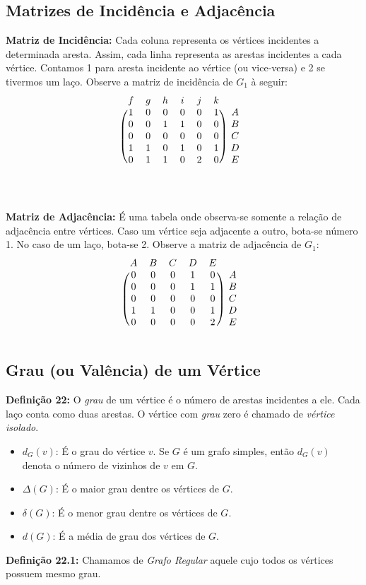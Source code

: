 \documentclass[a4paper,12pt]{article}
\begin{document}
	\subsection{Matrizes de Incidência e Adjacência}
	\noindent\textbf{Matriz de Incidência: }Cada coluna representa os vértices incidentes a determinada aresta. Assim, cada linha representa as arestas incidentes a cada vértice. Contamos 1 para aresta incidente ao vértice (ou vice-versa) e 2 se tivermos um laço. Observe a matriz de incidência de $G_1$ à seguir:
	\[
	\begin{blockarray}{ccccccc}
	f & g & h & i & j & k \\
	\begin{block}{(cccccc)c}
	1 & 0 & 0 & 0 & 0 & 1 & A \\
	0 & 0 & 1 & 1 & 0 & 0 & B \\
	0 & 0 & 0 & 0 & 0 & 0 & C \\
	1 & 1 & 0 & 1 & 0 & 1 & D \\
	0 & 1 & 1 & 0 & 2 & 0 & E \\
	\end{block}
	\end{blockarray}
	\]
	\\
	\\
	\textbf{Matriz de Adjacência: }É uma tabela onde observa-se somente a relação de adjacência entre vértices. Caso um vértice seja adjacente a outro, bota-se número 1. No caso de um laço, bota-se 2. Observe a matriz de adjacência de $G_1$:
	\[
	\begin{blockarray}{cccccc}
	A & B & C & D & E\\
	\begin{block}{(ccccc)c}
	0 & 0 & 0 & 1 & 0 & A \\
	0 & 0 & 0 & 1 & 1 & B \\
	0 & 0 & 0 & 0 & 0 & C \\
	1 & 1 & 0 & 0 & 1 & D \\
	0 & 0 & 0 & 0 & 2 & E \\
	\end{block}
	\end{blockarray}
	\]
	\subsection{Grau (ou Valência) de um Vértice}
	\noindent\textbf{Definição 22: }O \textit{grau} de um vértice é o número de arestas incidentes a ele. Cada laço conta como duas arestas. O vértice com \textit{grau} zero é chamado de \textit{vértice isolado}.
	\begin{itemize}
		\item $d_{G}(v)$: É o grau do vértice $v$. Se $G$ é um grafo simples, então $d_{G}(v)$ denota o número de vizinhos de $v$ em $G$.
		\item $\Delta(G)$: É o maior grau dentre os vértices de $G$.
		\item $\delta(G)$: É o menor grau dentre os vértices de $G$.
		\item $d(G)$: É a média de grau dos vértices de $G$.
	\end{itemize}
	\textbf{Definição 22.1: }Chamamos de \textit{Grafo Regular} aquele cujo todos os vértices possuem mesmo grau.
	\\
\end{document}
